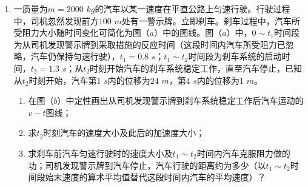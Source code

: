 \begin{enumerate}[leftmargin=0em]
{\begin{enumerate}
\end{enumerate}


}


\item
{}
一质量为$ m=2000 $ $ kg $的汽车以某一速度在平直公路上匀速行驶。行驶过程中，司机忽然发现前方$ 100 $ $ m $处有一警示牌。立即刹车。刹车过程中，汽车所受阻力大小随时间变化可简化为图（$ a $）中的图线。图（$ a $）中，$ 0 \sim t_{1} $时间段为从司机发现警示牌到采取措施的反应时间（这段时间内汽车所受阻力已忽略，汽车仍保持匀速行驶），$ t_{1} =0.8 $ $ s $；$ t_{1} \sim t_{2} $时间段为刹车系统的启动时间，$ t_{2} =1.3 $ $ s $；从$ t_{2} $时刻开始汽车的刹车系统稳定工作，直至汽车停止，已知从$ t_{2} $时刻开始，汽车第$ 1 $ $ s $内的位移为$ 24 $ $ m $，第$ 4 $ $ s $内的位移为$ 1 $ $ m $。
\begin{enumerate}
\renewcommand{\labelenumi}{\arabic{enumi}.}
\item
在图（$ b $）中定性画出从司机发现警示牌到刹车系统稳定工作后汽车运动的$ v-t $图线；
\item 
求$ t_{2} $时刻汽车的速度大小及此后的加速度大小；
\item 
求刹车前汽车匀速行驶时的速度大小及$ t_{1} \sim t_{2} $时间内汽车克服阻力做的功；司机发现警示牌到汽车停止，汽车行驶的距离约为多少（以$ t_{1} \sim t_{2} $时间段始末速度的算术平均值替代这段时间内汽车的平均速度）？




\end{enumerate}
\begin{figure}[h!]
\flushright
 \qquad 
 
\end{figure}










\end{enumerate}


